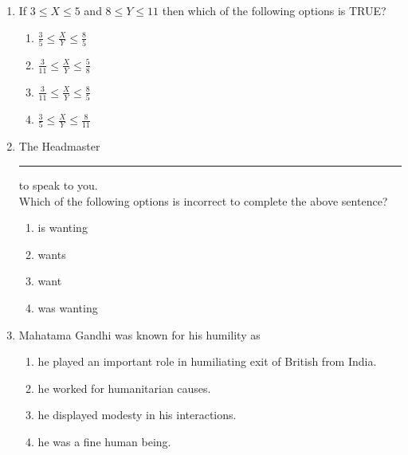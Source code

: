 \documentclass[journal,12pt,onecolumn]{IEEEtran}
\theoremstyle{remark}
\begin{document}
\begin{enumerate}[resume]

\item If $3 \leq X \leq 5$ and $8 \leq Y \leq 11$ then which of the following options is TRUE?
    \begin{enumerate}
        \item $\frac{3}{5} \leq \frac{X}{Y} \leq \frac{8}{5}$
        \item $\frac{3}{11} \leq \frac{X}{Y} \leq \frac{5}{8}$
        \item $\frac{3}{11} \leq \frac{X}{Y} \leq \frac{8}{5}$
        \item $\frac{3}{5} \leq \frac{X}{Y} \leq \frac{8}{11}$
    \end{enumerate}
    \hfill{}
    


\item The Headmaster \rule{2cm}{0.15mm} to speak to you. \\ Which of the following options is incorrect to complete the above sentence?
    \begin{enumerate}
        \item is wanting
        \item wants
        \item want
        \item was wanting
    \end{enumerate}
    \hfill{}



\item Mahatama Gandhi was known for his humility as
    \begin{enumerate}
        \item he played an important role in humiliating exit of British from India.
        \item he worked for humanitarian causes.
        \item he displayed modesty in his interactions.
        \item he was a fine human being.
    \end{enumerate}
    \hfill{}




\end{enumerate}
\end{document}
